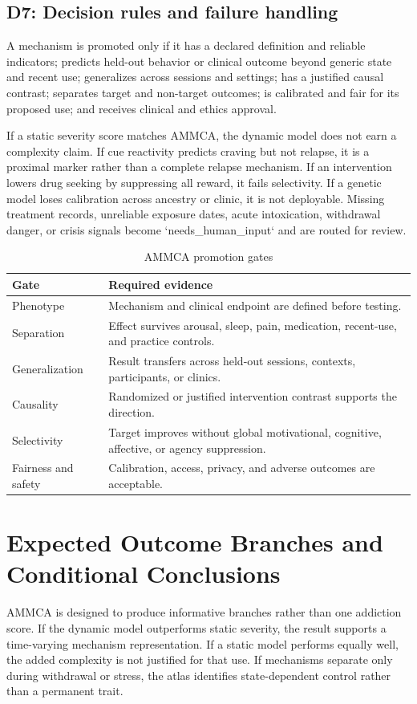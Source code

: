 \documentclass[conference]{IEEEtran}
\begin{document}
\subsection{D7: Decision rules and failure handling}
A mechanism is promoted only if it has a declared definition and reliable indicators; predicts held-out behavior or clinical outcome beyond generic state and recent use; generalizes across sessions and settings; has a justified causal contrast; separates target and non-target outcomes; is calibrated and fair for its proposed use; and receives clinical and ethics approval.

If a static severity score matches AMMCA, the dynamic model does not earn a complexity claim. If cue reactivity predicts craving but not relapse, it is a proximal marker rather than a complete relapse mechanism. If an intervention lowers drug seeking by suppressing all reward, it fails selectivity. If a genetic model loses calibration across ancestry or clinic, it is not deployable. Missing treatment records, unreliable exposure dates, acute intoxication, withdrawal danger, or crisis signals become `needs\_human\_input` and are routed for review.

\begin{table}[t]
\caption{AMMCA promotion gates}
\label{tab:gates}
\centering
\footnotesize
\setlength{\tabcolsep}{2pt}
\begin{tabular}{p{}p{}}
\toprule
Gate & Required evidence \\
\midrule
Phenotype & Mechanism and clinical endpoint are defined before testing. \\
Separation & Effect survives arousal, sleep, pain, medication, recent-use, and practice controls. \\
Generalization & Result transfers across held-out sessions, contexts, participants, or clinics. \\
Causality & Randomized or justified intervention contrast supports the direction. \\
Selectivity & Target improves without global motivational, cognitive, affective, or agency suppression. \\
Fairness and safety & Calibration, access, privacy, and adverse outcomes are acceptable. \\
\bottomrule
\end{tabular}
\end{table}

\section{Expected Outcome Branches and Conditional Conclusions}
AMMCA is designed to produce informative branches rather than one addiction score. If the dynamic model outperforms static severity, the result supports a time-varying mechanism representation. If a static model performs equally well, the added complexity is not justified for that use. If mechanisms separate only during withdrawal or stress, the atlas identifies state-dependent control rather than a permanent trait.
\end{document}
